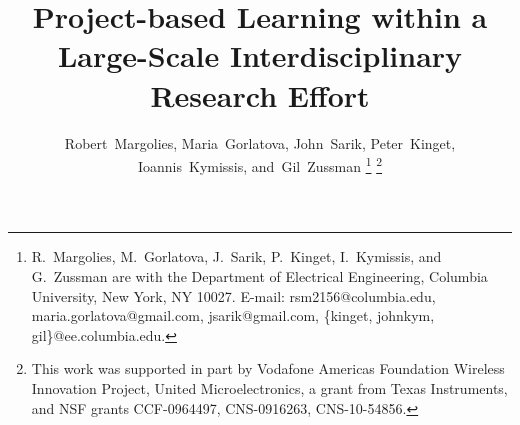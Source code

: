 \documentclass[journal,twopages]{IEEEtran}
\newif\ifarxiv
\begin{document}
\title{Project-based Learning within a Large-Scale Interdisciplinary Research Effort\vspace*{0.2in}}

\author{Robert~Margolies, Maria~Gorlatova, John~Sarik, Peter~Kinget, Ioannis~Kymissis, and~Gil~Zussman \thanks{R.~Margolies, M.~Gorlatova, J.~Sarik, P.~Kinget, I.~Kymissis, and G.~Zussman are with the Department of Electrical Engineering, Columbia University, New York, NY 10027. E-mail: rsm2156@columbia.edu, maria.gorlatova@gmail.com, jsarik@gmail.com,
\{kinget, johnkym, gil\}@ee.columbia.edu.}\ifarxiv
\thanks{
A partial and preliminary version of this paper was presented in 2013 ACM Conference on Innovation and Technology in Computer Science Education (ITiCSE'13)~\cite{Gorlatova2013Project}. }\fi
\thanks{This work was supported in part by Vodafone Americas Foundation Wireless Innovation Project, United Microelectronics, a grant from Texas Instruments, and NSF grants CCF-0964497, CNS-0916263, CNS-10-54856.}
}









\maketitle
\end{document}
